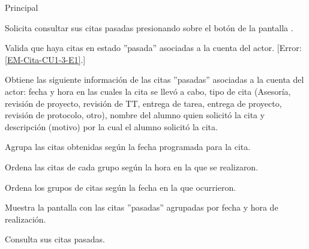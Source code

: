 \begin{UCtrayectoria}{Principal}

	\UCpaso [\UCactor] Solicita consultar sus citas pasadas presionando sobre el botón  de la pantalla .

	\UCpaso Valida que haya citas en estado ''pasada'' asociadas a la cuenta del actor. [Error: \ref{EM-Cita-CU1-3-E1}.]

	\UCpaso Obtiene las siguiente información de las citas ''pasadas'' asociadas a la cuenta del actor: fecha y hora en las cuales la cita se llevó a cabo, tipo de cita (Asesoría, revisión de proyecto, revisión de TT, entrega de tarea, entrega de proyecto, revisión de protocolo, otro), nombre del alumno quien solicitó la cita y descripción (motivo) por la cual el alumno solicitó la cita.

	\UCpaso Agrupa las citas obtenidas según la fecha programada para la cita.

	\UCpaso Ordena las citas de cada grupo según la hora en la que se realizaron. 

	\UCpaso Ordena los grupos de citas según la fecha en la que ocurrieron.

	\UCpaso Muestra la pantalla  con las citas ''pasadas'' agrupadas por fecha y hora de realización. 

	\UCpaso [\UCactor] Consulta sus citas pasadas. 

\end{UCtrayectoria}

